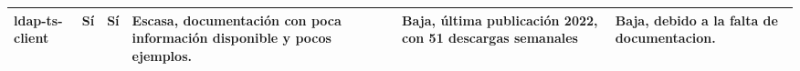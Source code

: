 \begin{landscape}
\begin{longtable}{|l|p{3cm}|p{2.5cm}|p{6cm}|p{5cm}|p{6cm}|}
        \hline
        ldap-ts-client        & Sí                             & Sí                          & Escasa, documentación con poca información disponible y pocos ejemplos.                                                                    & Baja, última publicación 2022, con 51 descargas semanales                              & Baja, debido a la falta de documentacion.                                                                              \\
        \hline
    \end{longtable}
\end{landscape}
\restoregeometry